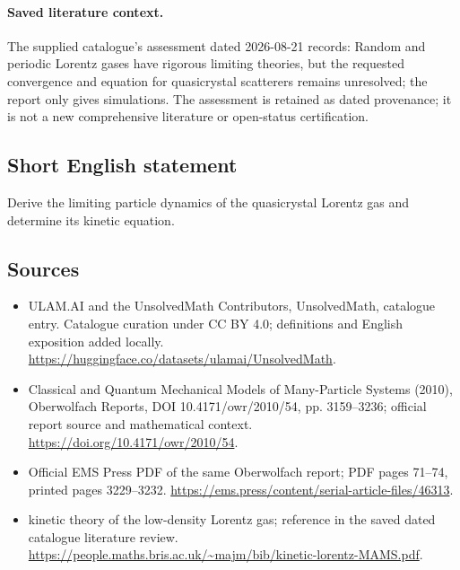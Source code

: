 \documentclass[11pt]{article}
\begin{document}
\paragraph{Saved literature context.} The supplied catalogue's assessment dated 2026-08-21 records: Random and periodic Lorentz gases have rigorous limiting theories, but the requested convergence and equation for quasicrystal scatterers remains unresolved; the report only gives simulations. The assessment is retained as dated provenance; it is not a new comprehensive literature or open-status certification.
\subsection{Short English statement}
Derive the limiting particle dynamics of the quasicrystal Lorentz gas and determine its kinetic equation.
\subsection{Sources}
\begin{itemize}
\item[\hypertarget{source:statement:1}{S1}] ULAM.AI and the UnsolvedMath Contributors, UnsolvedMath, catalogue entry. Catalogue curation under CC BY 4.0; definitions and English exposition added locally.
\url{https://huggingface.co/datasets/ulamai/UnsolvedMath}.
\item[\hypertarget{source:statement:2}{S2}] Classical and Quantum Mechanical Models of Many-Particle Systems (2010), Oberwolfach Reports, DOI 10.4171/owr/2010/54, pp. 3159--3236; official report source and mathematical context.
\url{https://doi.org/10.4171/owr/2010/54}.
\item[\hypertarget{source:statement:3}{S3}] Official EMS Press PDF of the same Oberwolfach report; PDF pages 71--74, printed pages 3229--3232.
\url{https://ems.press/content/serial-article-files/46313}.
\item[\hypertarget{source:statement:4}{S4}] kinetic theory of the low-density Lorentz gas; reference in the saved dated catalogue literature review.
\url{https://people.maths.bris.ac.uk/~majm/bib/kinetic-lorentz-MAMS.pdf}.
\end{itemize}
\label{end:statement}
\end{document}
